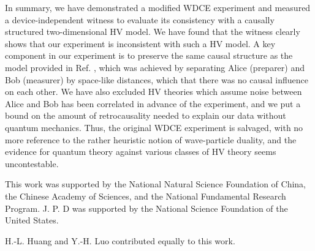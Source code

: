 \documentclass[aps,prl,twocolumn,amsmath,amssymb,nofootinbib,superscriptaddress]{revtex4-1}
\begin{document}
In summary, we have demonstrated a modified WDCE experiment and measured a device-independent witness to evaluate its consistency with a causally structured two-dimensional HV model.  We have found that the witness clearly shows that our experiment is inconsistent with such a HV model.  A key component in our experiment is to preserve the same causal structure as the model provided in Ref. \cite{Chaves2018}, which was achieved by separating Alice (preparer) and Bob (measurer) by space-like distances, which that there was no causal influence on each other.  We have also excluded HV theories which assume noise between Alice and Bob has been correlated in advance of the experiment, and we put a bound on the amount of retrocausality needed to explain our data without quantum mechanics.  Thus, the original WDCE experiment is salvaged, with no more reference to the rather heuristic notion of wave-particle duality, and the evidence for quantum theory against various classes of HV theory seems uncontestable.

This work was supported by the National Natural Science Foundation of China, the Chinese Academy of Sciences, and the National Fundamental Research Program. J. P. D was supported by the National Science Foundation of the United States.

H.-L. Huang and Y.-H. Luo contributed equally to this work.












\end{document}

